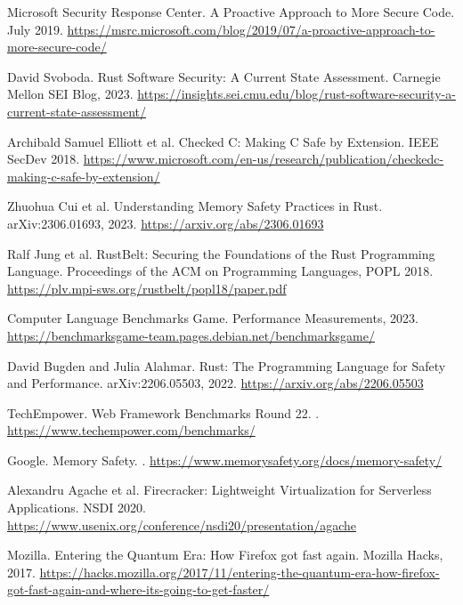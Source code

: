 \documentclass[11pt]{article}
\begin{document}
\begin{thebibliography}{99}
Microsoft Security Response Center.
\newblock A Proactive Approach to More Secure Code.
\newblock July 2019.
\newblock \url{https://msrc.microsoft.com/blog/2019/07/a-proactive-approach-to-more-secure-code/}

David Svoboda.
\newblock Rust Software Security: A Current State Assessment.
\newblock Carnegie Mellon SEI Blog, 2023.
\newblock \url{https://insights.sei.cmu.edu/blog/rust-software-security-a-current-state-assessment/}

Archibald Samuel Elliott et al.
\newblock Checked C: Making C Safe by Extension.
\newblock IEEE SecDev 2018.
\newblock \url{https://www.microsoft.com/en-us/research/publication/checkedc-making-c-safe-by-extension/}

Zhuohua Cui et al.
\newblock Understanding Memory Safety Practices in Rust.
\newblock arXiv:2306.01693, 2023.
\newblock \url{https://arxiv.org/abs/2306.01693}

Ralf Jung et al.
\newblock RustBelt: Securing the Foundations of the Rust Programming Language.
\newblock Proceedings of the ACM on Programming Languages, POPL 2018.
\newblock \url{https://plv.mpi-sws.org/rustbelt/popl18/paper.pdf}

Computer Language Benchmarks Game.
\newblock Performance Measurements, 2023.
\newblock \url{https://benchmarksgame-team.pages.debian.net/benchmarksgame/}

David Bugden and Julia Alahmar.
\newblock Rust: The Programming Language for Safety and Performance.
\newblock arXiv:2206.05503, 2022.
\newblock \url{https://arxiv.org/abs/2206.05503}

TechEmpower.
\newblock Web Framework Benchmarks Round 22.
.
\newblock \url{https://www.techempower.com/benchmarks/}

Google.
\newblock Memory Safety.
.
\newblock \url{https://www.memorysafety.org/docs/memory-safety/}

Alexandru Agache et al.
\newblock Firecracker: Lightweight Virtualization for Serverless Applications.
\newblock NSDI 2020.
\newblock \url{https://www.usenix.org/conference/nsdi20/presentation/agache}

Mozilla.
\newblock Entering the Quantum Era: How Firefox got fast again.
\newblock Mozilla Hacks, 2017.
\newblock \url{https://hacks.mozilla.org/2017/11/entering-the-quantum-era-how-firefox-got-fast-again-and-where-its-going-to-get-faster/}


\end{thebibliography}
\end{document}
